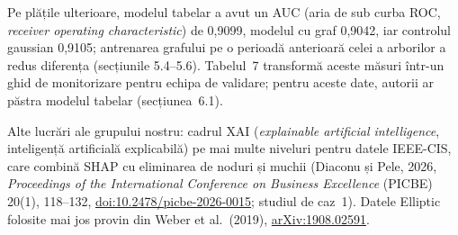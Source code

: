 \begin{itemize}
{Pe plățile ulterioare, modelul tabelar a avut un AUC (aria de sub curba ROC, \emph{receiver operating characteristic}) de 0,9099, modelul cu graf 0,9042, iar controlul gaussian 0,9105; antrenarea grafului pe o perioadă anterioară celei a arborilor a redus diferența (secțiunile 5.4--5.6). Tabelul~7 transformă aceste măsuri într-un ghid de monitorizare pentru echipa de validare; pentru aceste date, autorii ar păstra modelul tabelar (secțiunea~6.1).}
\end{itemize}
{\footnotesize\color{FooterGray}%
{Alte lucrări ale grupului nostru: cadrul XAI (\emph{explainable artificial intelligence}, inteligență artificială explicabilă) pe mai multe niveluri pentru datele IEEE-CIS, care combină SHAP cu eliminarea de noduri și muchii (Diaconu și Pele, 2026, \emph{Proceedings of the International Conference on Business Excellence} (PICBE) 20(1), 118--132, \href{https://doi.org/10.2478/picbe-2026-0015}{doi:10.2478/picbe-2026-0015}; studiul de caz~1). Datele Elliptic folosite mai jos provin din Weber et al.\ (2019), \href{https://arxiv.org/abs/1908.02591}{arXiv:1908.02591}.}}

